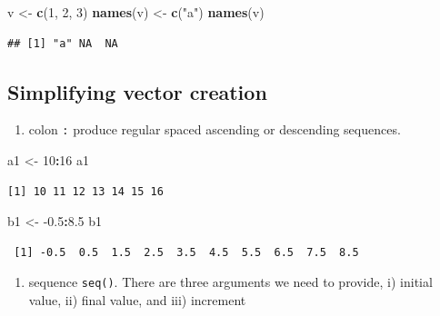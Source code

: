 \documentclass[]{book}
\newenvironment{Shaded}{\begin{snugshade}}{\end{snugshade}}
\newcommand{\DecValTok}[1]{\textcolor[rgb]{0.00,0.00,0.81}{#1}}
\newcommand{\FloatTok}[1]{\textcolor[rgb]{0.00,0.00,0.81}{#1}}
\newcommand{\KeywordTok}[1]{\textcolor[rgb]{0.13,0.29,0.53}{\textbf{#1}}}
\newcommand{\NormalTok}[1]{#1}
\newcommand{\OperatorTok}[1]{\textcolor[rgb]{0.81,0.36,0.00}{\textbf{#1}}}
\newcommand{\StringTok}[1]{\textcolor[rgb]{0.31,0.60,0.02}{#1}}
\providecommand{\tightlist}{%
  \setlength{\itemsep}{0pt}\setlength{\parskip}{0pt}}
\begin{document}
\begin{Shaded}
\begin{Highlighting}[]
\NormalTok{v <-}\StringTok{ }\KeywordTok{c}\NormalTok{(}\DecValTok{1}\NormalTok{, }\DecValTok{2}\NormalTok{, }\DecValTok{3}\NormalTok{)}
\KeywordTok{names}\NormalTok{(v) <-}\StringTok{ }\KeywordTok{c}\NormalTok{(}\StringTok{"a"}\NormalTok{)}
\KeywordTok{names}\NormalTok{(v)}
\end{Highlighting}
\end{Shaded}

\begin{verbatim}
## [1] "a" NA  NA
\end{verbatim}

\hypertarget{simplifying-vector-creation}{%
\subsection{Simplifying vector creation}\label{simplifying-vector-creation}}

\begin{enumerate}
\def\labelenumi{\arabic{enumi}.}
\tightlist
\item
  colon \texttt{:} produce regular spaced ascending or descending sequences.
\end{enumerate}

\begin{Shaded}
\begin{Highlighting}[]
\NormalTok{a1 <-}\StringTok{ }\DecValTok{10}\OperatorTok{:}\DecValTok{16}
\NormalTok{a1}
\end{Highlighting}
\end{Shaded}

\begin{verbatim}
[1] 10 11 12 13 14 15 16
\end{verbatim}

\begin{Shaded}
\begin{Highlighting}[]
\NormalTok{b1 <-}\StringTok{ }\FloatTok{-0.5}\OperatorTok{:}\FloatTok{8.5}
\NormalTok{b1}
\end{Highlighting}
\end{Shaded}

\begin{verbatim}
 [1] -0.5  0.5  1.5  2.5  3.5  4.5  5.5  6.5  7.5  8.5
\end{verbatim}

\begin{enumerate}
\def\labelenumi{\arabic{enumi}.}
\setcounter{enumi}{1}
\tightlist
\item
  sequence \texttt{seq()}. There are three arguments we need to provide, i) initial value, ii) final value, and iii) increment
\end{enumerate}
\end{document}
